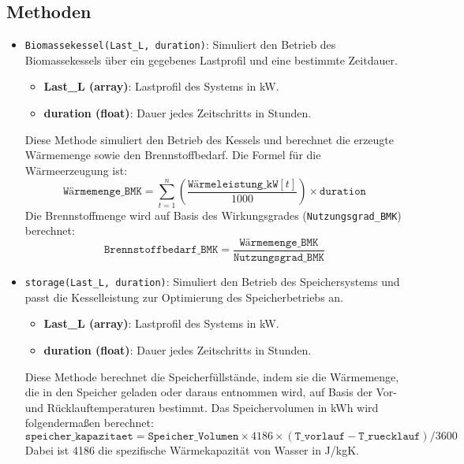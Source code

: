 \subsection{Methoden}
\begin{itemize}
    \item \texttt{Biomassekessel(Last\_L, duration)}: Simuliert den Betrieb des Biomassekessels über ein gegebenes Lastprofil und eine bestimmte Zeitdauer.
    \begin{itemize}
        \item \textbf{Last\_L (array)}: Lastprofil des Systems in kW.
        \item \textbf{duration (float)}: Dauer jedes Zeitschritts in Stunden.
    \end{itemize}
    
    Diese Methode simuliert den Betrieb des Kessels und berechnet die erzeugte Wärmemenge sowie den Brennstoffbedarf. Die Formel für die Wärmeerzeugung ist:
    \[
    \texttt{Wärmemenge\_BMK} = \sum_{t=1}^{n} \left( \frac{\texttt{Wärmeleistung\_kW}[t]}{1000} \right) \times \texttt{duration}
    \]
    Die Brennstoffmenge wird auf Basis des Wirkungsgrades (\texttt{Nutzungsgrad\_BMK}) berechnet:
    \[
    \texttt{Brennstoffbedarf\_BMK} = \frac{\texttt{Wärmemenge\_BMK}}{\texttt{Nutzungsgrad\_BMK}}
    \]

    \item \texttt{storage(Last\_L, duration)}: Simuliert den Betrieb des Speichersystems und passt die Kesselleistung zur Optimierung des Speicherbetriebs an.
    \begin{itemize}
        \item \textbf{Last\_L (array)}: Lastprofil des Systems in kW.
        \item \textbf{duration (float)}: Dauer jedes Zeitschritts in Stunden.
    \end{itemize}
    
    Diese Methode berechnet die Speicherfüllstände, indem sie die Wärmemenge, die in den Speicher geladen oder daraus entnommen wird, auf Basis der Vor- und Rücklauftemperaturen bestimmt. Das Speichervolumen in kWh wird folgendermaßen berechnet:
    \[
    \texttt{speicher\_kapazitaet} = \texttt{Speicher\_Volumen} \times 4186 \times (\texttt{T\_vorlauf} - \texttt{T\_ruecklauf}) / 3600
    \]
    Dabei ist 4186 die spezifische Wärmekapazität von Wasser in J/kgK.


\end{itemize}
